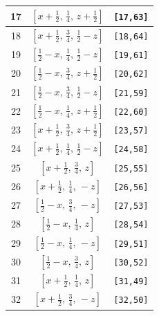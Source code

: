 \documentclass[fleqn,8pt]{jsarticle}
\begin{document}
\begin{longtable}{ccc}
17 & $\left[ x + \frac{1}{2},\, \frac{1}{4},\, z + \frac{1}{2} \right]$ & {\tt [17,63]} \\ \hline
18 & $\left[ x + \frac{1}{2},\, \frac{3}{4},\, \frac{1}{2} - z \right]$ & {\tt [18,64]} \\ \hline
19 & $\left[ \frac{1}{2} - x,\, \frac{1}{4},\, \frac{1}{2} - z \right]$ & {\tt [19,61]} \\ \hline
20 & $\left[ \frac{1}{2} - x,\, \frac{3}{4},\, z + \frac{1}{2} \right]$ & {\tt [20,62]} \\ \hline
21 & $\left[ \frac{1}{2} - x,\, \frac{3}{4},\, \frac{1}{2} - z \right]$ & {\tt [21,59]} \\ \hline
22 & $\left[ \frac{1}{2} - x,\, \frac{1}{4},\, z + \frac{1}{2} \right]$ & {\tt [22,60]} \\ \hline
23 & $\left[ x + \frac{1}{2},\, \frac{3}{4},\, z + \frac{1}{2} \right]$ & {\tt [23,57]} \\ \hline
24 & $\left[ x + \frac{1}{2},\, \frac{1}{4},\, \frac{1}{2} - z \right]$ & {\tt [24,58]} \\ \hline
25 & $\left[ x + \frac{1}{2},\, \frac{3}{4},\, z \right]$ & {\tt [25,55]} \\ \hline
26 & $\left[ x + \frac{1}{2},\, \frac{1}{4},\, - z \right]$ & {\tt [26,56]} \\ \hline
27 & $\left[ \frac{1}{2} - x,\, \frac{3}{4},\, - z \right]$ & {\tt [27,53]} \\ \hline
28 & $\left[ \frac{1}{2} - x,\, \frac{1}{4},\, z \right]$ & {\tt [28,54]} \\ \hline
29 & $\left[ \frac{1}{2} - x,\, \frac{1}{4},\, - z \right]$ & {\tt [29,51]} \\ \hline
30 & $\left[ \frac{1}{2} - x,\, \frac{3}{4},\, z \right]$ & {\tt [30,52]} \\ \hline
31 & $\left[ x + \frac{1}{2},\, \frac{1}{4},\, z \right]$ & {\tt [31,49]} \\ \hline
32 & $\left[ x + \frac{1}{2},\, \frac{3}{4},\, - z \right]$ & {\tt [32,50]} \\
\end{longtable}
\renewcommand{\arraystretch}{1.2}
\end{document}

